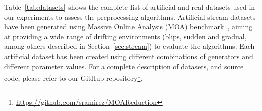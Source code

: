 \documentclass[preprint,12pt]{elsarticle}
\begin{document}
Table~\ref{tab:datasets} shows the complete list of artificial and real datasets used in our experiments to assess the preprocessing algorithms. Artificial stream datasets have been generated using Massive Online Analysis (MOA) benchmark~\cite{bifet10}, aiming at providing a wide range of drifting environments (blips, sudden and gradual, among others described in Section~\ref{sec:stream}) to evaluate the algorithms. Each artificial dataset has been created using different combinations of generators and different parameter values. For a complete description of datasets, and source code, please refer to our GitHub repository\footnote{\url{https://github.com/sramirez/MOAReduction}}. 

\begin{table}[!htp]
\renewcommand{\arraystretch}{1.3}
\centering
\scriptsize
\caption{Relevant information about classification datasets. For each
row, the number of instances evaluated (\#Inst.), the number of attributes (\#Atts.) (which ones are numerical (\#Num.) and which ones nominal (\#Nom.)), the number of classes (\#Cl), and whether the dataset is artificially generated or not (artificial) are shown.}
\label{tab:datasets}
\end{table}
\end{document}
